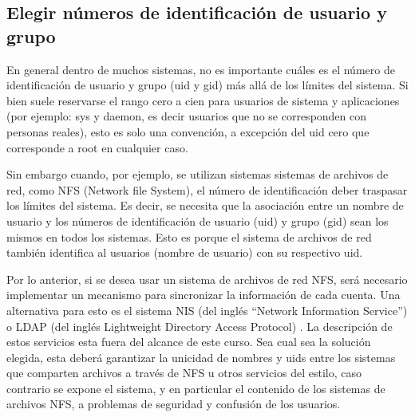 \documentclass[12pt]{article}
\begin{document}
\subsection*{Elegir números de identificación de usuario y grupo}
En general dentro de muchos sistemas, no es importante cuáles es el número de 
identificación de usuario y grupo (uid y gid) más allá de los límites del sistema. 
Si bien suele reservarse el rango cero a cien 
para usuarios de sistema y aplicaciones (por ejemplo: sys y daemon, es decir usuarios 
que no se corresponden con personas reales), esto es solo una convención, 
a excepción del uid cero que corresponde a root en cualquier caso.  

Sin embargo cuando, por ejemplo, se utilizan sistemas sistemas de archivos de red, como 
NFS (Network file System), el número de identificación deber traspasar
los límites del sistema. Es decir, se necesita que la asociación entre un nombre de 
usuario y los números de identificación de usuario (uid) y grupo (gid) sean los mismos en todos
los sistemas. Esto es porque el sistema de archivos de red también identifica al
usuarios (nombre de usuario) con su respectivo uid.  

Por lo anterior, si se desea usar un sistema de archivos de red NFS,
será necesario implementar un mecanismo 
para sincronizar la información de cada cuenta. Una alternativa para esto 
es el sistema NIS (del inglés ``Network Information Service'') o LDAP (del inglés Lightweight 
Directory Access Protocol) . La descripción de estos servicios 
esta fuera del alcance de este curso. Sea cual sea la solución elegida, esta deberá 
garantizar la unicidad de nombres y uids entre los sistemas que comparten 
archivos a través de NFS u otros servicios del estilo, caso contrario se expone
el sistema, y en particular el contenido de los sistemas de archivos NFS, a 
problemas de seguridad y confusión de los usuarios. 

\end{document}
